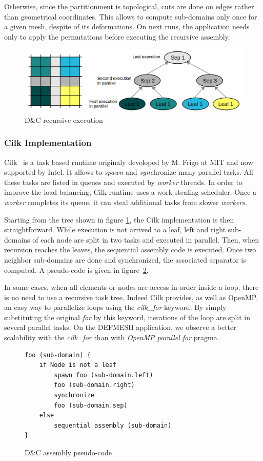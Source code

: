 \documentclass{IOS-Book-Article}
\begin{document}
Otherwise, since the partitionment is topological, cuts are done on edges rather than geometrical coordinates.
This allows to compute sub-domains only once for a given mesh, despite of its deformations.
On next runs, the application needs only to apply the permutations before executing the recursive assembly.
\begin{figure}[htp]
 \centering
 \includegraphics[scale=0.25]{DC_recursion.png}
 \caption{D\&C recursive execution}
 \label{fig:DCrec}
\end{figure}

\subsubsection{Cilk Implementation}
Cilk~\cite{cilk5} is a task based runtime originaly developed by M. Frigo at MIT and now supported by Intel.
It allows to \emph{spawn} and \emph{sync}hronize many parallel tasks.
All these tasks are listed in queues and executed by \emph{worker} threads.
In order to improve the load balancing, Cilk runtime uses a work-stealing scheduler. Once a \emph{worker} completes its queue, it can steal additional tasks from slower \emph{workers}.

Starting from the tree shown in figure \ref{fig:DCrec}, the Cilk implementation is then straightforward.
While execution is not arrived to a leaf, left and right sub-domains of each node are split in two tasks and executed in parallel.
Then, when recursion reaches the leaves, the sequential assembly code is executed.
Once two neighbor sub-domains are done and synchronized, the associated separator is computed.
A pseudo-code is given in figure~\ref{fig:DCcode}.

In some cases, when all elements or nodes are access in order inside a loop, there is no need to use a recursive task tree.
Indeed Cilk provides, as well as OpenMP, an easy way to parallelize loops using the \emph{cilk\_for} keyword.
By simply substituting the original \emph{for} by this keyword, iterations of the loop are split in several parallel tasks.
On the DEFMESH application, we observe a better scalability with the \emph{cilk\_for} than with \emph{OpenMP parallel for} pragma.
\begin{figure}[htp]
 \begin{verbatim}
foo (sub-domain) {
    if Node is not a leaf
        spawn foo (sub-domain.left)
        foo (sub-domain.right)
        synchronize
        foo (sub-domain.sep)
    else
        sequential assembly (sub-domain)
}
 \end{verbatim}
 \caption{D\&C assembly pseudo-code}
 \label{fig:DCcode}
\end{figure}
\end{document}

